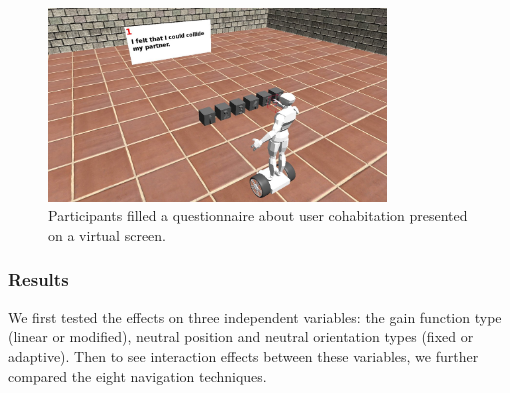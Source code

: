 \begin{figure}[tb]
  \centering
  \includegraphics[width=0.8\textwidth]{figures/ch4/t3_q}
  \caption{\label{fig:4_task3_q}Participants filled a questionnaire about user cohabitation presented on a virtual screen.}
\end{figure}


\subsubsection{Results}
We first tested the effects on three independent variables: the gain function type (linear or modified), neutral position and neutral orientation types (fixed or adaptive). Then to see interaction effects between these variables, we further compared the eight navigation techniques.

